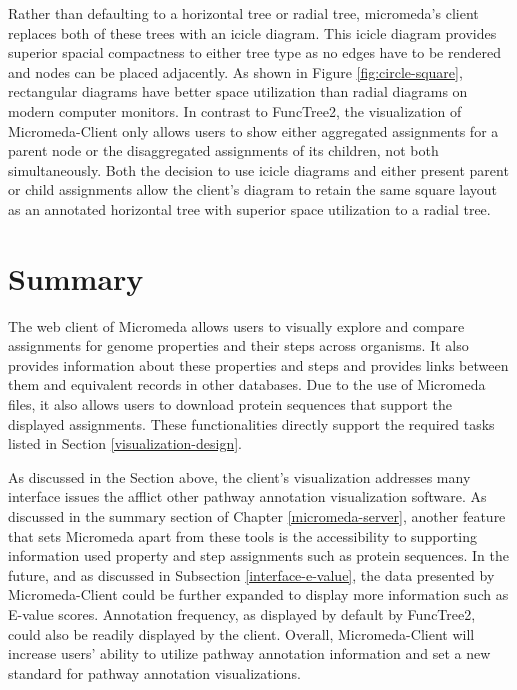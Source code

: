 Rather than defaulting to a horizontal tree or radial tree, micromeda's client 
replaces both of these trees with an icicle diagram. This icicle diagram 
provides superior spacial compactness to either tree type as no edges have to be 
rendered and nodes can be placed adjacently. As shown in Figure 
\ref{fig:circle-square}, rectangular diagrams have better space utilization than 
radial diagrams on modern computer monitors. In contrast to FuncTree2, the 
visualization of Micromeda-Client only allows users to show either aggregated 
assignments for a parent node or the disaggregated assignments of its children, 
not both simultaneously. Both the decision to use icicle diagrams and either 
present parent or child assignments allow the client's diagram to retain the 
same square layout as an annotated horizontal tree with superior space 
utilization to a radial tree. 

\section{Summary} \label{micromeda-client-summary}

The web client of Micromeda allows users to visually explore and compare 
assignments for genome properties and their steps across organisms. It also 
provides information about these properties and steps and provides links between 
them and equivalent records in other databases. Due to the use of Micromeda 
files, it also allows users to download protein sequences that support the 
displayed assignments. These functionalities directly support the required tasks 
listed in Section \ref{visualization-design}.

As discussed in the Section above, the client's visualization addresses many 
interface issues the afflict other pathway annotation visualization software. As 
discussed in the summary section of Chapter \ref{micromeda-server}, another 
feature that sets Micromeda apart from these tools is the accessibility to 
supporting information used property and step assignments such as protein 
sequences. In the future, and as discussed in Subsection 
\ref{interface-e-value}, the data presented by Micromeda-Client could be further 
expanded to display more information such as E-value scores. Annotation 
frequency, as displayed by default by FuncTree2, could also be readily displayed 
by the client. Overall, Micromeda-Client will increase users' ability to utilize 
pathway annotation information and set a new standard for pathway annotation 
visualizations.
